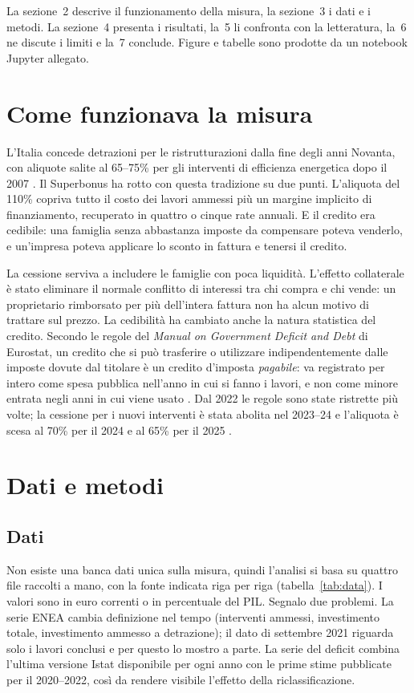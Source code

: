 \documentclass[11pt,a4paper]{article}
\begin{document}
La sezione~2 descrive il funzionamento della misura, la sezione~3 i dati e i metodi. La sezione~4 presenta i risultati, la~5 li confronta con la letteratura, la~6 ne discute i limiti e la~7 conclude. Figure e tabelle sono prodotte da un notebook Jupyter allegato.

\section{Come funzionava la misura}
L'Italia concede detrazioni per le ristrutturazioni dalla fine degli anni Novanta, con aliquote salite al 65--75\% per gli interventi di efficienza energetica dopo il 2007 \citep{capone2026}. Il Superbonus ha rotto con questa tradizione su due punti. L'aliquota del 110\% copriva tutto il costo dei lavori ammessi più un margine implicito di finanziamento, recuperato in quattro o cinque rate annuali. E il credito era cedibile: una famiglia senza abbastanza imposte da compensare poteva venderlo, e un'impresa poteva applicare lo sconto in fattura e tenersi il credito.

La cessione serviva a includere le famiglie con poca liquidità. L'effetto collaterale è stato eliminare il normale conflitto di interessi tra chi compra e chi vende: un proprietario rimborsato per più dell'intera fattura non ha alcun motivo di trattare sul prezzo. La cedibilità ha cambiato anche la natura statistica del credito. Secondo le regole del \textit{Manual on Government Deficit and Debt} di Eurostat, un credito che si può trasferire o utilizzare indipendentemente dalle imposte dovute dal titolare è un credito d'imposta \textit{pagabile}: va registrato per intero come spesa pubblica nell'anno in cui si fanno i lavori, e non come minore entrata negli anni in cui viene usato \citep{capone2026,istat2023eurostat}. Dal 2022 le regole sono state ristrette più volte; la cessione per i nuovi interventi è stata abolita nel 2023--24 e l'aliquota è scesa al 70\% per il 2024 e al 65\% per il 2025 \citep{capone2026}.

\section{Dati e metodi}
\subsection{Dati}
Non esiste una banca dati unica sulla misura, quindi l'analisi si basa su quattro file raccolti a mano, con la fonte indicata riga per riga (tabella~\ref{tab:data}). I valori sono in euro correnti o in percentuale del PIL. Segnalo due problemi. La serie ENEA cambia definizione nel tempo (interventi ammessi, investimento totale, investimento ammesso a detrazione); il dato di settembre 2021 riguarda solo i lavori conclusi e per questo lo mostro a parte. La serie del deficit combina l'ultima versione Istat disponibile per ogni anno con le prime stime pubblicate per il 2020--2022, così da rendere visibile l'effetto della riclassificazione.
\end{document}
